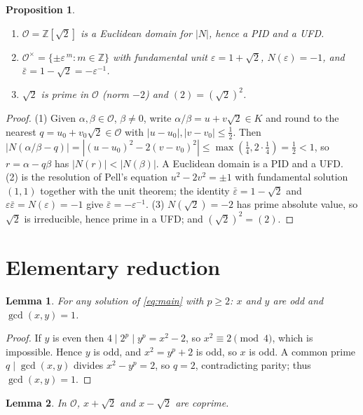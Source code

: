 \documentclass{amsart}
\newtheorem{lemma}{Lemma}
\newtheorem{proposition}{Proposition}
\theoremstyle{definition}
\begin{document}
\begin{proposition}\label{prop:ring}
\leavevmode
\begin{enumerate}
\item $\mathcal{O}=\mathbb{Z}[\sqrt2]$ is a Euclidean domain for $|N|$, hence a
PID and a UFD.
\item $\mathcal{O}^{\times}=\{\pm\varepsilon^{\,m}:m\in\mathbb{Z}\}$ with
fundamental unit $\varepsilon=1+\sqrt2$, $N(\varepsilon)=-1$, and
$\bar\varepsilon=1-\sqrt2=-\varepsilon^{-1}$.
\item $\sqrt2$ is prime in $\mathcal{O}$ (norm $-2$) and $(2)=(\sqrt2)^2$.
\end{enumerate}
\end{proposition}

\begin{proof}
(1) Given $\alpha,\beta\in\mathcal{O}$, $\beta\ne0$, write
$\alpha/\beta=u+v\sqrt2\in K$ and round to the nearest $q=u_0+v_0\sqrt2\in
\mathcal O$ with $|u-u_0|,|v-v_0|\le\frac12$. Then
$|N(\alpha/\beta-q)|=|(u-u_0)^2-2(v-v_0)^2|\le\max(\tfrac14,2\cdot\tfrac14)=\tfrac12<1$,
so $r=\alpha-q\beta$ has $|N(r)|<|N(\beta)|$. A Euclidean domain is a PID and a
UFD. (2) is the resolution of Pell's equation $u^2-2v^2=\pm1$ with
fundamental solution $(1,1)$ together with the unit theorem; the identity
$\bar\varepsilon=1-\sqrt2$ and $\varepsilon\bar\varepsilon=N(\varepsilon)=-1$
give $\bar\varepsilon=-\varepsilon^{-1}$. (3) $N(\sqrt2)=-2$ has prime
absolute value, so $\sqrt2$ is irreducible, hence prime in a UFD; and
$(\sqrt2)^2=(2)$.
\end{proof}

\section{Elementary reduction}\label{sec:reduction}

\begin{lemma}\label{lem:parity}
For any solution of \eqref{eq:main} with $p\ge2$: $x$ and $y$ are odd and
$\gcd(x,y)=1$.
\end{lemma}

\begin{proof}
If $y$ is even then $4\mid 2^p\mid y^p=x^2-2$, so $x^2\equiv2\pmod4$, which is
impossible. Hence $y$ is odd, and $x^2=y^p+2$ is odd, so $x$ is odd. A common
prime $q\mid\gcd(x,y)$ divides $x^2-y^p=2$, so $q=2$, contradicting parity;
thus $\gcd(x,y)=1$.
\end{proof}

\begin{lemma}\label{lem:coprime}
In $\mathcal{O}$, $x+\sqrt2$ and $x-\sqrt2$ are coprime.
\end{lemma}
\end{document}
